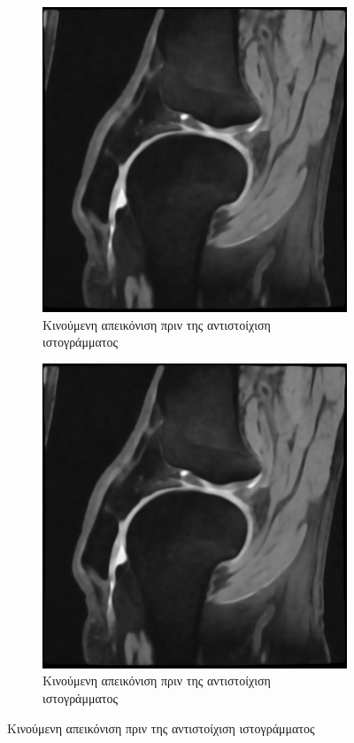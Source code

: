 \documentclass[a4paper,12pt]{article}
\begin{document}
\begin{figure}[H]
    \centering

    \begin{subfigure}[t]{0.4\linewidth}
    \includegraphics[width=\linewidth]{original_moving_1.png}
    \caption{Κινούμενη απεικόνιση πριν της αντιστοίχιση ιστογράμματος}
    \end{subfigure}
    \begin{subfigure}[t]{0.4\linewidth}
    \includegraphics[width=\linewidth]{original_moving_histogram_matching_1.png}
    \caption{Κινούμενη απεικόνιση πριν της αντιστοίχιση ιστογράμματος}
    \end{subfigure}


\end{figure}
\end{document}
